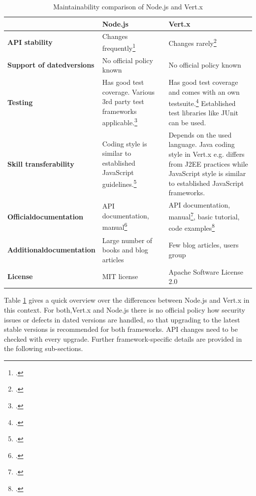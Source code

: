 \begin{savenotes}
\begin{table}[ht]
\begin{tabular*}{\textwidth}{p{} p{} p{}}
\toprule
				& \textbf{Node.js} & \textbf{Vert.x} \\
\midrule 
\textbf{API stability}
& Changes frequently\footcite[Cf.][]{node_api_changes_2012}
& Changes rarely\footcite[Cf.][]{vertx_2012}
\\	
\textbf{Support of dated\newline versions}
& No official policy known
& No official policy known
\\
\textbf{Testing}
& Has good test coverage. Various 3rd party test frameworks applicable.\footcite[Cf.][]{node_testing_2013}
& Has good test coverage and comes with an own testsuite.\footcite[Cf.][]{vertx_repository_2013} Established test libraries like JUnit can be used.
\\						  
\textbf{Skill transferability}	
& Coding style is similar to established JavaScript guidelines.\footcite[Cf.][]{node_style_2012}							
& Depends on the used language. Java coding style in Vert.x e.g. differs from J2EE practices
\nomenclature{J2EE}{Java 2 Enterprise  Edition} while JavaScript style
is similar to established JavaScript frameworks.
\\
\textbf{Official\newline documentation}
& API documentation, manual\footcite[Cf.][]{node_2012}
& API documentation, manual\footcite[Cf.][]{vertx_2012}, basic tutorial, code examples\footcite[Cf.][]{Fox_2013}
\\
\textbf{Additional\newline documentation}
& Large number of books and blog articles
& Few blog articles, users group
\\
\textbf{License}			
& MIT license 			
& Apache Software License 2.0
 \\
\bottomrule 
\end{tabular*}
  \caption{Maintainability comparison of Node.js and Vert.x}
  \label{tbl_maintain}
\end{table}
\end{savenotes}

Table \ref{tbl_maintain} gives a quick overview over the differences between
Node.js and Vert.x in this context. For both,Vert.x and Node.js there is no
official policy how security issues or defects in dated versions are handled, so
that upgrading to the latest stable versions is recommended for both frameworks.
API changes need to be checked with every upgrade.
Further framework-specific details are provided in the following sub-sections.\\



